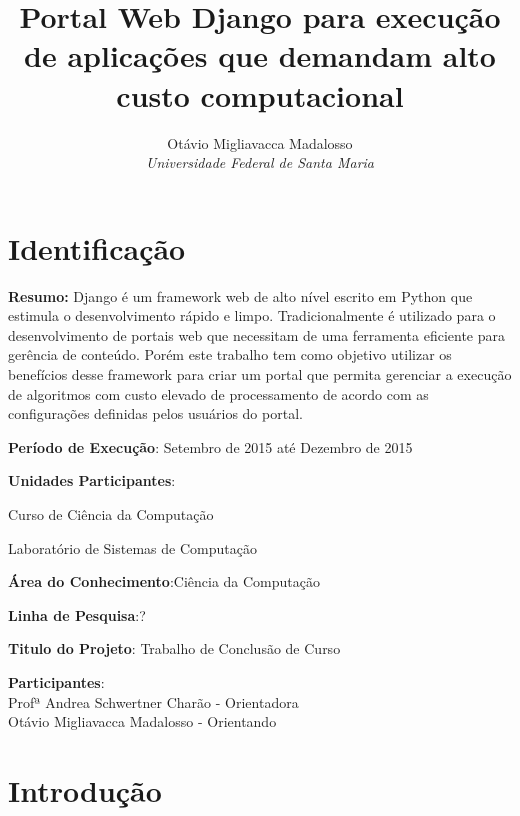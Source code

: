 \documentclass[12pt]{article}
\title{Portal Web Django para execução de aplicações que demandam alto custo computacional}
\author{Otávio Migliavacca Madalosso \\ \emph{Universidade Federal de Santa Maria}}
\begin{document}
\maketitle


\section{Identificação}

\begin{description} \itemsep 0pt

\item{\textbf{Resumo:}} Django é um framework web de alto nível escrito em Python que estimula o desenvolvimento rápido e limpo. Tradicionalmente é utilizado para o desenvolvimento de portais web que necessitam de uma ferramenta eficiente para gerência de conteúdo. Porém este trabalho tem como objetivo utilizar os benefícios desse framework para criar um portal que permita gerenciar a execução de algoritmos com custo elevado de processamento de acordo com as configurações definidas pelos usuários do portal.


\item{\textbf{Período de Execução}}: Setembro de 2015 até Dezembro de 2015

\item{\textbf{Unidades Participantes}}: 

    Curso de Ciência da Computação
    
    Laboratório de Sistemas de Computação
    
    
\item{\textbf{Área do Conhecimento}}:Ciência da Computação

\item{\textbf{Linha de Pesquisa}}:?

\item{\textbf{Titulo do Projeto}}: Trabalho de Conclusão de Curso

\item{\textbf{Participantes}}:
\\Profª Andrea Schwertner Charão - Orientadora
\\Otávio Migliavacca Madalosso - Orientando
\\ 
\end{description}


\section{Introdução}
\end{document}
